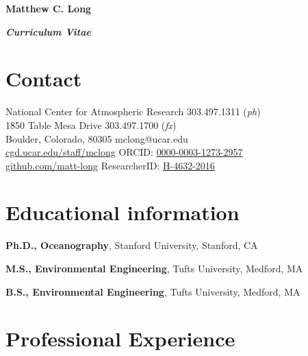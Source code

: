 \documentclass[11pt]{article}
\begin{document}
{\Large \textbf{Matthew C. Long}}
\smallskip

{\large \bf \itshape Curriculum Vitae}

\section*{Contact}
\begin{description}[style=multiline,leftmargin=2.5cm,font=\normalfont]
\item National Center for Atmospheric Research
\hfill 303.497.1311 (\textit{ph})\\
1850 Table Mesa Drive
\hfill 303.497.1700 (\textit{fx})\\
Boulder, Colorado, 80305
\hfill mclong@ucar.edu\\
\href{http://cgd.ucar.edu/staff/mclong}{cgd.ucar.edu/staff/mclong}
\hfill ORCID:
\href{http://orcid.org/0000-0003-1273-2957}{0000-0003-1273-2957} \\
\href{http://github.com/matt-long}{github.com/matt-long}
\hfill ResearcherID:
\href{http://www.researcherid.com/rid/H-4632-2016}{H-4632-2016}
\end{description}


\section{Educational information}

\begin{description}[style=multiline,leftmargin=2.5cm,font=\normalfont]
\item[2010]	\textbf{Ph.D.,  Oceanography}, Stanford University, Stanford, CA
\item[2000]	\textbf{M.S., Environmental Engineering}, Tufts University, Medford, MA
\item[1998]	\textbf{B.S., Environmental Engineering}, Tufts University, Medford, MA
\end{description}


\section{Professional Experience}
\end{document}
